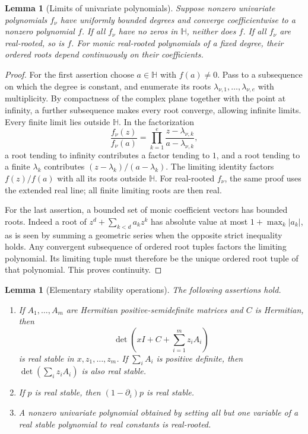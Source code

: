 \documentclass[11pt]{amsart}
\newtheorem{lemma}[theorem]{Lemma}
\theoremstyle{definition}
\theoremstyle{remark}
\numberwithin{equation}{section}
\begin{document}
\begin{lemma}[Limits of univariate polynomials]
\label{lem:mss-polynomial-limits}
Suppose nonzero univariate polynomials $f_\nu$ have uniformly bounded
degrees and converge coefficientwise to a nonzero polynomial $f$.
If all $f_\nu$ have no zeros in $\mathbb H$, neither does $f$.
If all $f_\nu$ are real-rooted, so is $f$.
For monic real-rooted polynomials of a fixed degree, their ordered
roots depend continuously on their coefficients.
\end{lemma}

\begin{proof}
For the first assertion choose $a\in\mathbb H$ with $f(a)\ne0$.
Pass to a subsequence on which the degree is constant, and enumerate
its roots $\lambda_{\nu,1},\ldots,\lambda_{\nu,e}$ with multiplicity.
By compactness of the complex plane together with the point at
infinity, a further subsequence makes every root converge, allowing
infinite limits.  Every finite limit lies outside $\mathbb H$.
In the factorization
\[
 \frac{f_\nu(z)}{f_\nu(a)}
   =\prod_{k=1}^e\frac{z-\lambda_{\nu,k}}{a-\lambda_{\nu,k}},
\]
a root tending to infinity contributes a factor tending to $1$, and
a root tending to a finite $\lambda_k$ contributes
$(z-\lambda_k)/(a-\lambda_k)$.  The limiting identity factors
$f(z)/f(a)$ with all its roots outside $\mathbb H$.
For real-rooted $f_\nu$, the same proof uses the extended real line;
all finite limiting roots are then real.

For the last assertion, a bounded set of monic coefficient vectors
has bounded roots.  Indeed a root of
$z^d+\sum_{k<d}a_kz^k$ has absolute value at most
$1+\max_k|a_k|$, as is seen by summing a geometric series when the
opposite strict inequality holds.  Any convergent subsequence of
ordered root tuples factors the limiting polynomial.  Its limiting
tuple must therefore be the unique ordered root tuple of that
polynomial.  This proves continuity.
\end{proof}

\begin{lemma}[Elementary stability operations]
\label{lem:mss-stability}
The following assertions hold.
\begin{enumerate}
\item If $A_1,\ldots,A_m$ are Hermitian positive-semidefinite matrices
and $C$ is Hermitian, then
\[
 \det\left(xI+C+\sum_{i=1}^m z_iA_i\right)
\]
is real stable in $x,z_1,\ldots,z_m$.
If $\sum_iA_i$ is positive definite, then
$\det(\sum_i z_iA_i)$ is also real stable.
\item If $p$ is real stable, then $(1-\partial_i)p$ is real stable.
\item A nonzero univariate polynomial obtained by setting all but one
variable of a real stable polynomial to real constants is real-rooted.
\end{enumerate}
\end{lemma}
\end{document}
